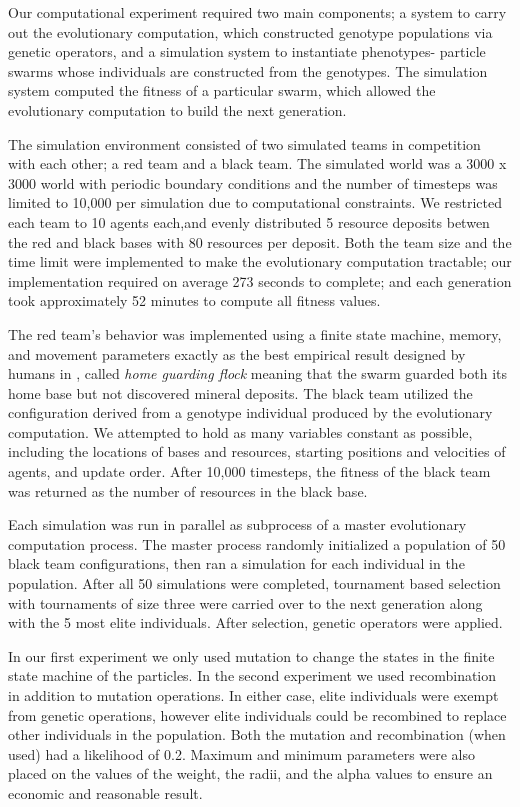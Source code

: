 \documentclass[12pt,journal,compsoc]{IEEEtran}
\begin{document}
Our computational experiment required two main components; a system to carry out the evolutionary computation, which constructed genotype populations via genetic operators, and a simulation system to instantiate phenotypes- particle swarms whose individuals are constructed from the genotypes. The simulation system computed the fitness of a particular swarm, which allowed the evolutionary computation to build the next generation.

The simulation environment consisted of two simulated teams in competition with each other; a red team and a black team. The simulated world was a 3000 x 3000 world with periodic boundary conditions and the number of timesteps was limited to 10,000 per simulation due to computational constraints. We restricted each team to 10 agents each,and evenly distributed 5 resource deposits betwen the red and black bases with 80 resources per deposit. Both the team size and the time limit were implemented to make the evolutionary computation tractable; our implementation required on average 273 seconds to complete; and each generation took approximately 52 minutes to compute all fitness values.

The red team's behavior was implemented using a finite state machine, memory, and movement parameters exactly as the best empirical result designed by humans in \cite{rodriguez2004extending}, called \textit{home guarding flock} meaning that the swarm guarded both its home base but not discovered mineral deposits. The black team utilized the configuration derived from a genotype individual produced by the evolutionary computation. We attempted to hold as many variables constant as possible, including the locations of bases and resources, starting positions and velocities of agents, and update order. After 10,000 timesteps, the fitness of the black team was returned as the number of resources in the black base.

Each simulation was run in parallel as subprocess of a master evolutionary computation process. The master process randomly initialized a population of 50 black team configurations, then ran a simulation for each individual in the population. After all 50 simulations were completed, tournament based selection with tournaments of size three were carried over to the next generation along with the 5 most elite individuals. After selection, genetic operators were applied.

In our first experiment we only used mutation to change the states in the finite state machine of the particles. In the second experiment we used recombination in addition to mutation operations. In either case, elite individuals were exempt from genetic operations, however elite individuals could be recombined to replace other individuals in the population. Both the mutation and recombination (when used) had a likelihood of 0.2. Maximum and minimum parameters were also placed on the values of the weight, the radii, and the alpha values to ensure an economic and reasonable result.
\end{document}
